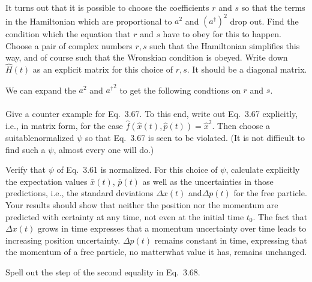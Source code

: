 \documentclass[boxes,pages]{homework}
\makeatletter
\numberwithin{@problem}{section}
\makeatother
\begin{document}
\begin{problem}
It turns out that it is possible to choose the coefficients $r$ and $s$ so that the terms in the Hamiltonian which are proportional to $a^2$ and $(a^\dagger)^2$ drop out. Find the condition which the equation that $r$ and $s$ have to obey for this to happen. Choose a pair of complex numbers $r, s$ such that the Hamiltonian simplifies this way, and of course such that the Wronskian condition is obeyed. Write down $\hat{H}(t)$ as an explicit matrix for this choice of $r, s$. It should be a diagonal matrix.
\end{problem}

\begin{solution}
	We can expand the $a^2$ and ${a^\dagger}^2$ to get the following condtions on $r$ and $s$.
	\begin{align*}
	\end{align*}
\end{solution}


\begin{problem}
	Give a counter example for Eq.\ 3.67. To this end, write out Eq.\ 3.67 explicitly, i.e., in matrix form, for the case $\hat{f}(\hat{x}(t), \hat{p}(t)) = \hat{x}^2$. Then choose a suitablenormalized $\psi$ so that Eq.\ 3.67 is seen to be violated. (It is not difficult to find such a $\psi$, almost every one will do.)
\end{problem}

\begin{solution}

\end{solution}

\begin{problem}
	Verify that $\psi$ of Eq.\ 3.61 is normalized. For this choice of $\psi$, calculate explicitly the expectation values $\bar{x}(t)$, $\bar{p}(t)$ as well as the uncertainties in those predictions, i.e., the standard deviations $\Delta x(t)$ and$\Delta p(t)$ for the free particle. Your results should show that neither the position nor the momentum are predicted with certainty at any time, not even at the initial time $t_0$. The fact that $\Delta x(t)$ grows in time expresses that a momentum uncertainty over time leads to increasing position uncertainty. $\Delta p(t)$ remains constant in time, expressing that the momentum of a free particle, no matterwhat value it has, remains unchanged.
\end{problem}

\begin{solution}

\end{solution}

\begin{problem}
Spell out the step of the second equality in Eq.\ 3.68.
\end{problem}

\begin{solution}

\end{solution}
\end{document}
